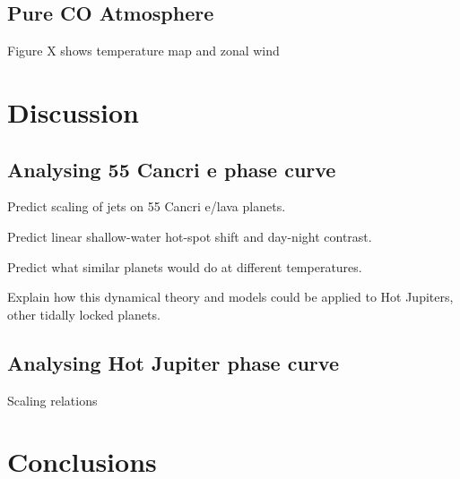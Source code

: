 \subsection{Pure CO Atmosphere}

Figure X shows temperature map and zonal wind





\section{Discussion}

\subsection{Analysing 55 Cancri e phase curve}

Predict scaling of jets on 55 Cancri e/lava planets.

Predict linear shallow-water hot-spot shift and day-night contrast.

Predict what similar planets would do at different temperatures.

Explain how this dynamical theory and models could be applied to Hot Jupiters, other tidally locked planets.

\subsection{Analysing Hot Jupiter phase curve}

Scaling relations


\section{Conclusions}




% 
% 
